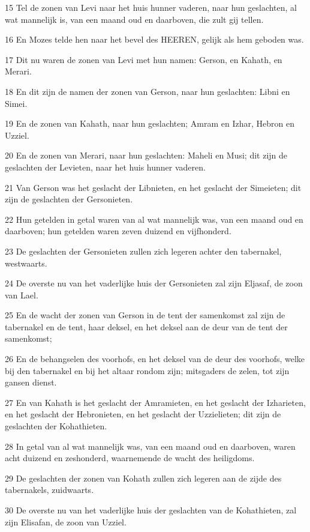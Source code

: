 \par 15 Tel de zonen van Levi naar het huis hunner vaderen, naar hun geslachten, al wat mannelijk is, van een maand oud en daarboven, die zult gij tellen.
\par 16 En Mozes telde hen naar het bevel des HEEREN, gelijk als hem geboden was.
\par 17 Dit nu waren de zonen van Levi met hun namen: Gerson, en Kahath, en Merari.
\par 18 En dit zijn de namen der zonen van Gerson, naar hun geslachten: Libni en Simei.
\par 19 En de zonen van Kahath, naar hun geslachten; Amram en Izhar, Hebron en Uzziel.
\par 20 En de zonen van Merari, naar hun geslachten: Maheli en Musi; dit zijn de geslachten der Levieten, naar het huis hunner vaderen.
\par 21 Van Gerson was het geslacht der Libnieten, en het geslacht der Simeieten; dit zijn de geslachten der Gersonieten.
\par 22 Hun getelden in getal waren van al wat mannelijk was, van een maand oud en daarboven; hun getelden waren zeven duizend en vijfhonderd.
\par 23 De geslachten der Gersonieten zullen zich legeren achter den tabernakel, westwaarts.
\par 24 De overste nu van het vaderlijke huis der Gersonieten zal zijn Eljasaf, de zoon van Lael.
\par 25 En de wacht der zonen van Gerson in de tent der samenkomst zal zijn de tabernakel en de tent, haar deksel, en het deksel aan de deur van de tent der samenkomst;
\par 26 En de behangselen des voorhofs, en het deksel van de deur des voorhofs, welke bij den tabernakel en bij het altaar rondom zijn; mitsgaders de zelen, tot zijn gansen dienst.
\par 27 En van Kahath is het geslacht der Amramieten, en het geslacht der Izharieten, en het geslacht der Hebronieten, en het geslacht der Uzzielieten; dit zijn de geslachten der Kohathieten.
\par 28 In getal van al wat mannelijk was, van een maand oud en daarboven, waren acht duizend en zeshonderd, waarnemende de wacht des heiligdoms.
\par 29 De geslachten der zonen van Kohath zullen zich legeren aan de zijde des tabernakels, zuidwaarts.
\par 30 De overste nu van het vaderlijke huis der geslachten van de Kohathieten, zal zijn Elisafan, de zoon van Uzziel.
